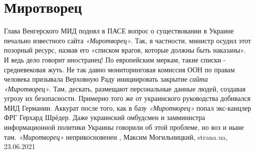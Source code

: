  
 
 
 
 
\chapter{Миротворец}
\label{sec:slova.mirotvorec}

Глава Венгерского МИД поднял в ПАСЕ вопрос о существовании в Украине печально
известного сайта \emph{«Миротворец»}.  Так, в частности, министр осудил этот
позорный ресурс, назвав его «списком врагов, которые должны быть наказаны». И
ведь дело говорит иностранец! По европейским меркам, такие списки -
средневековая жуть.  Не так давно мониторинговая комиссия ООН по правам
человека призывала Верховную Раду инициировать закрытие \emph{сайта
«Миротворец»}. Там, дескать, размещают персональные данные людей, создавая
угрозу их безопасности.  Примерно того же от украинского руководства добивался
МИД Германии. Аккурат после того, как в базу \emph{«Миротворец»} попал
экс-канцлер ФРГ Герхард Шрёдер.  Даже украинский омбудсмен и замминистра
информационной политики Украины говорили об этой проблеме, но воз и ныне там.
\emph{«Миротворец»} неприкосновенен
, 
Максим Могильницкий, strana.ua, 23.06.2021

